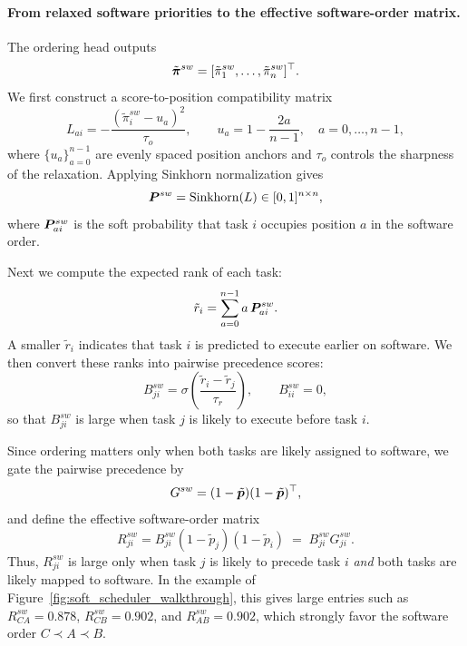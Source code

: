 \paragraph{\textbf{From relaxed software priorities to the effective software-order matrix.}}
The ordering head outputs
\begin{equation}
\tilde{\bm{\pi}}^{sw}=[\tilde{\pi}_1^{sw},\ldots,\tilde{\pi}_n^{sw}]^\top.
\end{equation}
We first construct a score-to-position compatibility matrix
\begin{equation}
L_{ai}=-\frac{(\tilde{\pi}_i^{sw}-u_a)^2}{\tau_o},
\qquad
u_a=1-\frac{2a}{n-1},
\quad a=0,\ldots,n-1,
\end{equation}
where $\{u_a\}_{a=0}^{n-1}$ are evenly spaced position anchors and $\tau_o$ controls the sharpness of the relaxation. Applying Sinkhorn normalization gives
\begin{equation}
{\bm{P}}^{sw}=\mathrm{Sinkhorn}(L)\in[0,1]^{n\times n},
\end{equation}
where ${\bm{P}}^{sw}_{ai}$ is the soft probability that task $i$ occupies position $a$ in the software order.

Next we compute the expected rank of each task:
\begin{equation}
\tilde r_i=\sum_{a=0}^{n-1} a\,{\bm{P}}^{sw}_{ai}.
\end{equation}
A smaller $\tilde r_i$ indicates that task $i$ is predicted to execute earlier on software. We then convert these ranks into pairwise precedence scores:
\begin{equation}
B^{sw}_{ji}
=
\sigma\!\left(\frac{\tilde r_i-\tilde r_j}{\tau_r}\right),
\qquad
B^{sw}_{ii}=0,
\end{equation}
so that $B^{sw}_{ji}$ is large when task $j$ is likely to execute before task $i$.

Since ordering matters only when both tasks are likely assigned to software, we gate the pairwise precedence by
\begin{equation}
G^{sw}=(1-\tilde{{\bm{p}}})(1-\tilde{{\bm{p}}})^\top,
\end{equation}
and define the effective software-order matrix
\begin{equation}
R^{sw}_{ji}=B^{sw}_{ji}(1-\tilde{p}_j)(1-\tilde{p}_i)
\;=\;
B^{sw}_{ji}G^{sw}_{ji}.
\end{equation}
Thus, $R^{sw}_{ji}$ is large only when task $j$ is likely to precede task $i$ \emph{and} both tasks are likely mapped to software. In the example of Figure~\ref{fig:soft_scheduler_walkthrough}, this gives large entries such as $R^{sw}_{CA}=0.878$, $R^{sw}_{CB}=0.902$, and $R^{sw}_{AB}=0.902$, which strongly favor the software order $C\prec A\prec B$.

